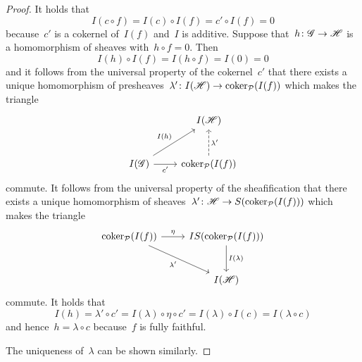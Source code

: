 \begin{example}
\begin{enumerate}
\begin{proof}
        It holds that
        \[
            I(c \circ f)
          = I(c) \circ I(f)
          = c' \circ I(f)
          = 0
        \]
        because~$c'$ is a cokernel of~$I(f)$ and~$I$ is additive.
        Suppose that~$h \colon \mathscr{G} \to \mathscr{H}$ is a homomorphism of sheaves with~$h \circ f = 0$.
        Then
        \[
          I(h) \circ I(f) = I(h \circ f) = I(0) = 0
        \]
        and it follows from the universal property of the cokernel~$c'$ that there exists a unique homomorphism of presheaves~$\lambda' \colon I(\mathscr{H}) \to \operatorname{coker}_{\mathcal{P}}(I(f))$ which makes the triangle
        \[
          \begin{tikzcd}[row sep = large]
              {}
            & I(\Hs)
            \\
              I(\Gs)
              \arrow{ur}[above left]{I(h)}
              \arrow{r}[below]{c'}
            & \coker_{\Pcat}(I(f))
              \arrow[dashed]{u}[right]{\lambda'}
          \end{tikzcd}
        \]
        commute. 
        It follows from the universal property of the sheafification that there exists a unique homomorphism of sheaves~$\lambda' \colon \mathscr{H} \to S(\operatorname{coker}_{\mathcal{P}}(I(f)))$ which makes the triangle
        \[
          \begin{tikzcd}[row sep = large]
              \coker_\Pcat(I(f))
              \arrow{r}[above]{\eta}
              \arrow{dr}[below left]{\lambda'}
            & IS(\coker_\Pcat(I(f)))
              \arrow{d}[right]{I(\lambda)}
            \\
              {}
            & I(\Hs)
          \end{tikzcd}
        \]
        commute.
        It holds that
        \[
            I(h)
          = \lambda' \circ c'
          = I(\lambda) \circ \eta \circ c'
          = I(\lambda) \circ I(c)
          = I(\lambda \circ c)
        \]
        and hence~$h = \lambda \circ c$ because~$f$ is fully faithful.
        
        The uniqueness of~$\lambda$ can be shown similarly.
      \end{proof}
      

\end{enumerate}
\end{example}
